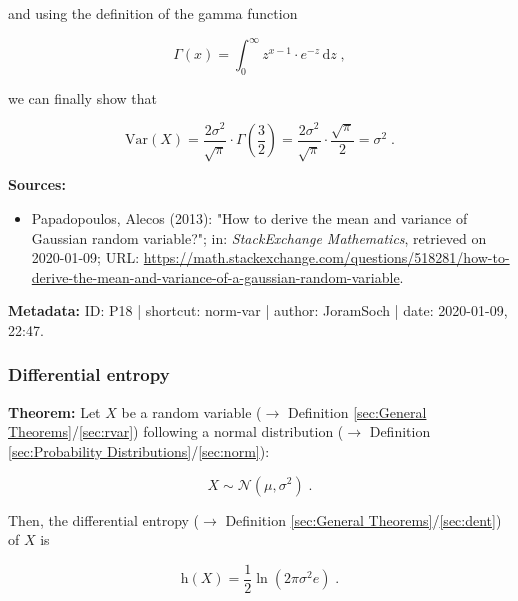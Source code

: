 \documentclass[a4paper,12pt,twoside]{book}
\begin{document}
and using the definition of the gamma function

\begin{equation} \label{eq:norm-var-gam-fct}
\Gamma(x) = \int_{0}^{\infty} z^{x-1} \cdot e^{-z} \, \mathrm{d}z \; ,
\end{equation}

we can finally show that

\begin{equation} \label{eq:norm-var-norm-var-s6}
\mathrm{Var}(X) = \frac{2 \sigma^2}{\sqrt{\pi}} \cdot \Gamma\!\left(\frac{3}{2}\right) = \frac{2 \sigma^2}{\sqrt{\pi}} \cdot \frac{\sqrt{\pi}}{2} = \sigma^2 \; .
\end{equation}



\vspace{1em}
\textbf{Sources:}
\begin{itemize}
\item Papadopoulos, Alecos (2013): "How to derive the mean and variance of Gaussian random variable?"; in: \textit{StackExchange Mathematics}, retrieved on 2020-01-09; URL: \url{https://math.stackexchange.com/questions/518281/how-to-derive-the-mean-and-variance-of-a-gaussian-random-variable}.
\end{itemize}


\vspace{1em}
\textbf{Metadata:} ID: P18 | shortcut: norm-var | author: JoramSoch | date: 2020-01-09, 22:47.
\vspace{1em}



\subsubsection[\textbf{Differential entropy}]{Differential entropy} \label{sec:norm-dent}
\setcounter{equation}{0}

\textbf{Theorem:} Let $X$ be a random variable ($\rightarrow$ Definition \ref{sec:General Theorems}/\ref{sec:rvar}) following a normal distribution ($\rightarrow$ Definition \ref{sec:Probability Distributions}/\ref{sec:norm}):

\begin{equation} \label{eq:norm-dent-norm}
X \sim \mathcal{N}(\mu, \sigma^2) \; .
\end{equation}

Then, the differential entropy ($\rightarrow$ Definition \ref{sec:General Theorems}/\ref{sec:dent}) of $X$ is

\begin{equation} \label{eq:norm-dent-norm-dent}
\mathrm{h}(X) = \frac{1}{2} \ln\left( 2 \pi \sigma^2 e \right) \; .
\end{equation}
\end{document}
